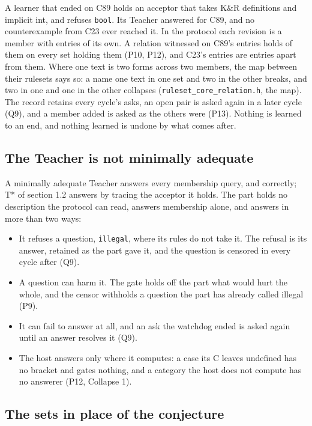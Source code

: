 A learner that ended on C89 holds an acceptor that takes K\&R definitions and implicit int, and refuses \texttt{bool}. Its Teacher answered for C89, and no counterexample from C23 ever reached it. In the protocol each revision is a member with entries of its own. A relation witnessed on C89's entries holds of them on every set holding them (P10, P12), and C23's entries are entries apart from them. Where one text is two forms across two members, the map between their rulesets says so: a name one text in one set and two in the other breaks, and two in one and one in the other collapses (\texttt{ruleset\_\allowbreak{}core\_\allowbreak{}relation.\allowbreak{}h}, the map). The record retains every cycle's asks, an open pair is asked again in a later cycle (Q9), and a member added is asked as the others were (P13). Nothing is learned to an end, and nothing learned is undone by what comes after.

\subsection{\texorpdfstring{The Teacher is not minimally adequate}{The Teacher is not minimally adequate}}

A minimally adequate Teacher answers every membership query, and correctly; T* of section 1.2 answers by tracing the acceptor it holds. The part holds no description the protocol can read, answers membership alone, and answers in more than two ways:

\begin{itemize}
\item It refuses a question, \texttt{illegal}, where its rules do not take it. The refusal is its answer, retained as the part gave it, and the question is censored in every cycle after (Q9).
\item A question can harm it. The gate holds off the part what would hurt the whole, and the censor withholds a question the part has already called illegal (P9).
\item It can fail to answer at all, and an ask the watchdog ended is asked again until an answer resolves it (Q9).
\item The host answers only where it computes: a case its C leaves undefined has no bracket and gates nothing, and a category the host does not compute has no answerer (P12, Collapse 1).
\end{itemize}

\subsection{\texorpdfstring{The sets in place of the conjecture}{The sets in place of the conjecture}}

